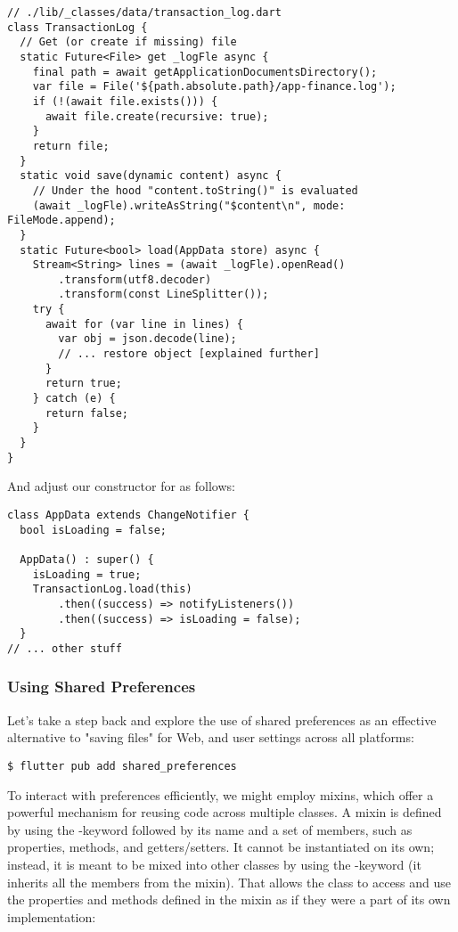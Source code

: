 \begin{lstlisting}
// ./lib/_classes/data/transaction_log.dart
class TransactionLog {
  // Get (or create if missing) file
  static Future<File> get _logFle async {
    final path = await getApplicationDocumentsDirectory();
    var file = File('${path.absolute.path}/app-finance.log');
    if (!(await file.exists())) {
      await file.create(recursive: true);
    }
    return file;
  }
  static void save(dynamic content) async {
    // Under the hood "content.toString()" is evaluated
    (await _logFle).writeAsString("$content\n", mode: FileMode.append);
  }
  static Future<bool> load(AppData store) async {
    Stream<String> lines = (await _logFle).openRead()
        .transform(utf8.decoder)
        .transform(const LineSplitter());
    try {
      await for (var line in lines) {
        var obj = json.decode(line);
        // ... restore object [explained further]
      }
      return true;
    } catch (e) {
      return false;
    }
  }
}
\end{lstlisting}

\noindent And adjust our constructor for  as follows:

\begin{lstlisting}
class AppData extends ChangeNotifier {
  bool isLoading = false;

  AppData() : super() {
    isLoading = true;
    TransactionLog.load(this)
        .then((success) => notifyListeners())
        .then((success) => isLoading = false);
  }
// ... other stuff
\end{lstlisting}


\subsubsection{Using Shared Preferences}

Let's take a step back and explore the use of shared preferences as an effective alternative to "saving files" for Web,
and user settings across all platforms:

\begin{lstlisting}[language=terminal]
$ flutter pub add shared_preferences
\end{lstlisting}

To interact with preferences efficiently, we might employ mixins, which offer a powerful mechanism for reusing code 
across multiple classes. A mixin is defined by using the -keyword followed by its name and a set of members, 
such as properties, methods, and getters/setters. It cannot be instantiated on its own; instead, it is meant to be mixed 
into other classes by using the -keyword (it inherits all the members from the mixin). That allows the class 
to access and use the properties and methods defined in the mixin as if they were a part of its own implementation:

